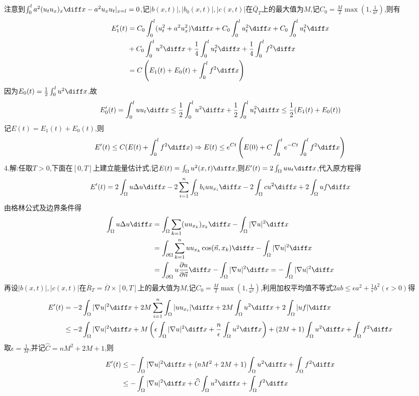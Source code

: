 注意到$\int_0^la^2(u_tu_x)_x\diff x-a^2u_xu_t|_{x=l}=0$,记$|b(x,t)|,|b_0(x,t)|,|c(x,t)|$在$\overline{Q}_T$上的最大值为$M$,记$C_0=\frac{M}{2}\max(1,\frac{1}{a^2})$,则有
\[\begin{split}
E_1'(t)&=C_0\int_0^l(u_t^2+a^2u_x^2)\diff x+C_0\int_0^lu_t^2\diff x+C_0\int_0^lu_t^2\diff x\\
&+C_0\int_0^lu^2\diff x+\frac{1}{4}\int_0^lu_t^2\diff x+\frac{1}{4}\int_0^lf^2\diff x\\
&=C\left(E_1(t)+E_0(t)+\int_0^lf^2\diff x\right)
\end{split}\]
因为$E_0(t)=\frac{1}{2}\int_0^lu^2\diff x$,故
\[E_0'(t)=\int_0^luu_t\diff x\leq\frac{1}{2}\int_0^lu^2\diff x+\frac{1}{2}\int_0^lu_t^2\diff x\leq\frac{1}{2}(E_1(t)+E_0(t))\]
记$E(t)=E_1(t)+E_0(t)$,则
\[E'(t)\leq C(E(t)+\int_0^lf^2\diff x)\Rightarrow E(t)\leq e^{Ct}\left(E(0)+C\int_0^te^{-Ct}\int_0^lf^2\diff x\right)\]
\newline
4.解:任取$T>0$,下面在$[0,T]$上建立能量估计式,记$E(t)=\int_{\Omega}u^2(x,t)\diff x$,则$E'(t)=2\int_{\Omega}uu_t\diff x$,代入原方程得
\[E'(t)=2\int_{\Omega}u\Delta u\diff x-2\sum_{i=1}^n\int_{\Omega}b_iuu_{x_i}\diff x-2\int_{\Omega}cu^2\diff x+2\int_{\Omega}uf\diff x\]
由格林公式及边界条件得
\[\begin{split}
\int_{\Omega}u\Delta u\diff x&=\int_{\Omega}\sum_{k=1}(uu_{x_k})_{x_k}\diff x-\int_{\Omega}|\nabla u|^2\diff x\\
&=\int_{\partial\Omega}\sum_{k=1}^nuu_{x_k}\cos(\vec{n},x_k)\diff x-\int_{\Omega}|\nabla u|^2\diff x\\
&=\int_{\partial\Omega}u\frac{\partial u}{\partial\vec{n}}\diff x-\int_{\Omega}|\nabla u|^2\diff x=-\int_{\Omega}|\nabla u|^2\diff x
\end{split}\]
再设$|b(x,t)|,|c(x,t)|$在$\overline{R}_T=\overline{\Omega}\times[0,T]$上的最大值为$M$,记$C_0=\frac{M}{2}\max(1,\frac{1}{a^2})$,利用加权平均值不等式$2ab\leq\epsilon a^2+\frac{1}{\epsilon}b^2(\epsilon>0)$得
\[\begin{split}
E'(t)&=-2\int_{\Omega}|\nabla u|^2\diff x+2M\sum_{i=1}^n\int_{\Omega}|uu_{x_i}|\diff x+2M\int_{\Omega}u^2\diff x+2\int_{\Omega}|uf|\diff x\\
&\leq-2\int_{\Omega}|\nabla u|^2\diff x+M\left(\epsilon\int_{\Omega}|\nabla u|^2\diff x+\frac{n}{\epsilon}\int_{\Omega}u^2\diff x\right)+(2M+1)\int_{\Omega}u^2\diff x+\int_{\Omega}f^2\diff x
\end{split}\]
取$\epsilon=\frac{1}{M}$,并记$\widehat{C}=nM^2+2M+1$,则
\[\begin{split}
E'(t)&\leq-\int_{\Omega}|\nabla u|^2\diff x+(nM^2+2M+1)\int_{\Omega}u^2\diff x+\int_{\Omega}f^2\diff x\\
&\leq-\int_{\Omega}|\nabla u|^2\diff x+\widehat{C}\int_{\Omega}u^2\diff x+\int_{\Omega}f^2\diff x
\end{split}\]

